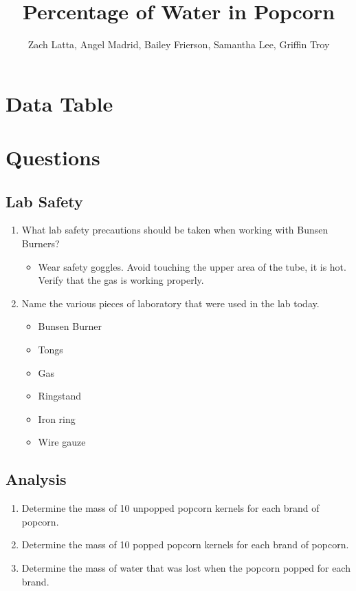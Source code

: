 \documentclass[12pt]{article}
\title{Percentage of Water in Popcorn}
\author{Zach Latta, Angel Madrid, Bailey Frierson, Samantha Lee, Griffin Troy}
\begin{document}
\maketitle

\section{Data Table}

\section{Questions}

\subsection{Lab Safety}

\begin{enumerate}
  \item What lab safety precautions should be taken when working with Bunsen Burners?
    \begin{itemize}
      \item Wear safety goggles. Avoid touching the upper area of the tube, it
        is hot. Verify that the gas is working properly.
    \end{itemize}
  \item Name the various pieces of laboratory that were used in the lab today.
    \begin{itemize}
      \item Bunsen Burner
      \item Tongs
      \item Gas
      \item Ringstand
      \item Iron ring
      \item Wire gauze
    \end{itemize}
\end{enumerate}

\subsection{Analysis}

\begin{enumerate}
  \item Determine the mass of 10 unpopped popcorn kernels for each brand of
    popcorn.
  \item Determine the mass of 10 popped popcorn kernels for each brand of popcorn.
  \item Determine the mass of water that was lost when the popcorn popped for each brand.
\end{enumerate}
\end{document}
